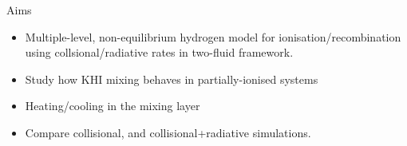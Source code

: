 \documentclass[10pt,aspectratio=169,usenames,dvipsnames]{beamer}
\begin{document}

\begin{frame}{Aims}
\begin{itemize}
    \item Multiple-level, non-equilibrium hydrogen model for ionisation/recombination using collsional/radiative rates in two-fluid framework.
    \item Study how KHI mixing behaves in partially-ionised systems
    \item Heating/cooling in the mixing layer
    \item Compare collisional, and collisional+radiative simulations.
\end{itemize}
\end{frame}

\end{document}
